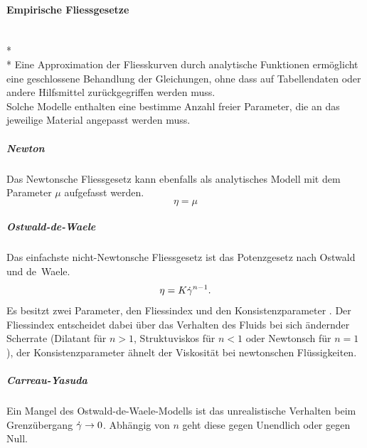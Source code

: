 %
\paragraph{Empirische Fliessgesetze}~\\*~\\*
Eine Approximation der Fliesskurven durch analytische Funktionen ermöglicht eine geschlossene Behandlung der Gleichungen, ohne dass auf Tabellendaten oder andere Hilfsmittel zurückgegriffen werden muss.\\
Solche Modelle enthalten eine bestimme Anzahl freier Parameter, die an das jeweilige Material angepasst werden muss.
\subparagraph{Newton}
Das Newtonsche Fliessgesetz kann ebenfalls als analytisches Modell mit dem Parameter $\mu$ aufgefasst werden.
\begin{equation}
    \eta = \mu
    \label{eq:fg:newton}
\end{equation}
\subparagraph{Ostwald-de-Waele}
Das einfachste nicht-Newtonsche Fliessgesetz ist das Potenzgesetz nach Ostwald und de~Waele.
\begin{equation}
    \eta=K\dot\gamma^{n-1}.
    \label{eq:fg:potenz}
\end{equation}
Es besitzt zwei Parameter, den Fliessindex  und den Konsistenzparameter . Der Fliessindex entscheidet dabei über das Verhalten des Fluids bei sich ändernder Scherrate (Dilatant für $n>1$, Struktuviskos für $n<1$ oder Newtonsch für $n=1$), der Konsistenzparameter ähnelt der Viskosität bei newtonschen Flüssigkeiten.
%
\subparagraph{Carreau-Yasuda}
Ein Mangel des Ostwald-de-Waele-Modells ist das unrealistische Verhalten beim Grenzübergang $\dot\gamma\rightarrow 0$. Abhängig von $n$ geht diese gegen Unendlich oder gegen Null.
